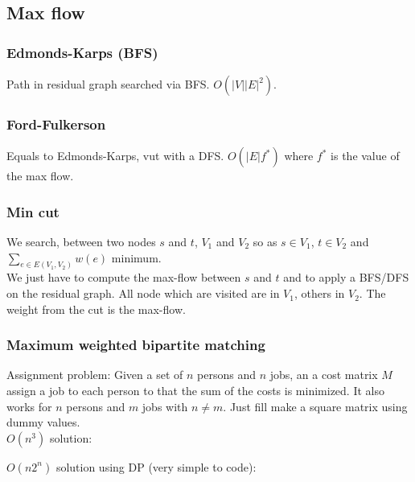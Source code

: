 \subsection{Max flow}
\subsubsection{Edmonds-Karps (BFS)}
Path in residual graph searched via BFS. $O(|V||E|^2)$.\\

\subsubsection{Ford-Fulkerson}
Equals to Edmonds-Karps, vut with a DFS. $O(|E|f^*)$ where $f^*$ is the value of the max flow.

\subsubsection{Min cut}
We search, between two nodes $s$ and $t$, $V_1$ and $V_2$ so as $s\in V_1$, $t\in V_2$ and $\sum_{e \in E(V_1, V_2)} w(e)$ minimum.\\
We just have to compute the max-flow between $s$ and $t$ and to apply a BFS/DFS on the residual graph. All node which are visited are in $V_1$, others in $V_2$. The weight from the cut is the max-flow.
\subsubsection{Maximum weighted bipartite matching}
Assignment problem: Given a set of $n$ persons and $n$ jobs, an a cost matrix $M$ assign a job to each person to that the sum of the costs is minimized. It also works for $n$ persons and $m$ jobs with $n \neq m$. Just fill make a square matrix using dummy values. \\

$O(n^3)$ solution:

\vspace{0.5cm}
$O(n 2^n)$ solution using DP (very simple to code):

